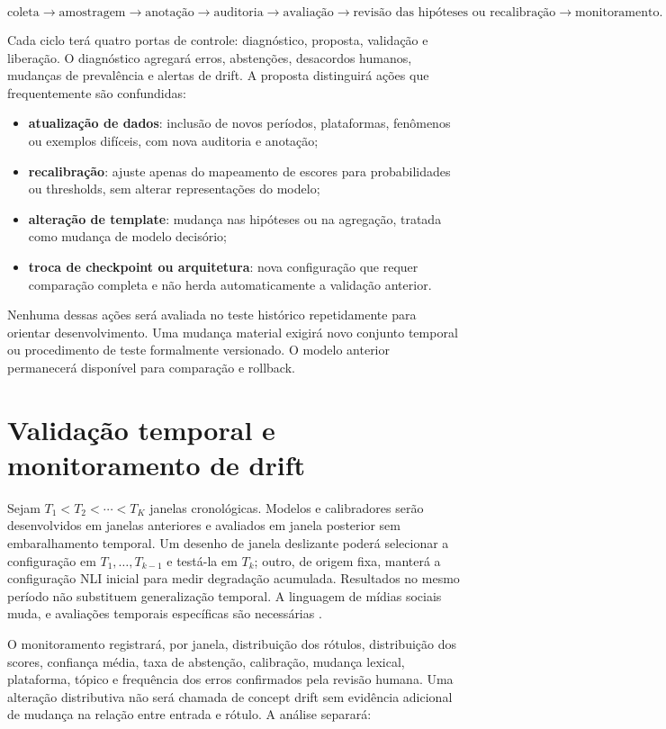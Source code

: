 \[
\text{coleta}\rightarrow\text{amostragem}\rightarrow\text{anotação}
\rightarrow\text{auditoria}\rightarrow\text{avaliação}
\rightarrow\text{revisão das hipóteses ou recalibração}\rightarrow\text{monitoramento}.
\]

Cada ciclo terá quatro portas de controle: diagnóstico, proposta, validação e liberação. O diagnóstico agregará erros, abstenções, desacordos humanos, mudanças de prevalência e alertas de drift. A proposta distinguirá ações que frequentemente são confundidas:

\begin{itemize}
\item \textbf{atualização de dados}: inclusão de novos períodos, plataformas, fenômenos ou exemplos difíceis, com nova auditoria e anotação;
\item \textbf{recalibração}: ajuste apenas do mapeamento de escores para probabilidades ou thresholds, sem alterar representações do modelo;
\item \textbf{alteração de template}: mudança nas hipóteses ou na agregação, tratada como mudança de modelo decisório;
\item \textbf{troca de checkpoint ou arquitetura}: nova configuração que requer comparação completa e não herda automaticamente a validação anterior.
\end{itemize}

Nenhuma dessas ações será avaliada no teste histórico repetidamente para orientar desenvolvimento. Uma mudança material exigirá novo conjunto temporal ou procedimento de teste formalmente versionado. O modelo anterior permanecerá disponível para comparação e rollback.

\section{Validação temporal e monitoramento de drift}

Sejam \(T_1<T_2<\cdots<T_K\) janelas cronológicas. Modelos e calibradores serão desenvolvidos em janelas anteriores e avaliados em janela posterior sem embaralhamento temporal. Um desenho de janela deslizante poderá selecionar a configuração em \(T_1,\ldots,T_{k-1}\) e testá-la em \(T_k\); outro, de origem fixa, manterá a configuração NLI inicial para medir degradação acumulada. Resultados no mesmo período não substituem generalização temporal. A linguagem de mídias sociais muda, e avaliações temporais específicas são necessárias \cite{ushio2024temporal}.

O monitoramento registrará, por janela, distribuição dos rótulos, distribuição dos scores, confiança média, taxa de abstenção, calibração, mudança lexical, plataforma, tópico e frequência dos erros confirmados pela revisão humana. Uma alteração distributiva não será chamada de concept drift sem evidência adicional de mudança na relação entre entrada e rótulo. A análise separará:

